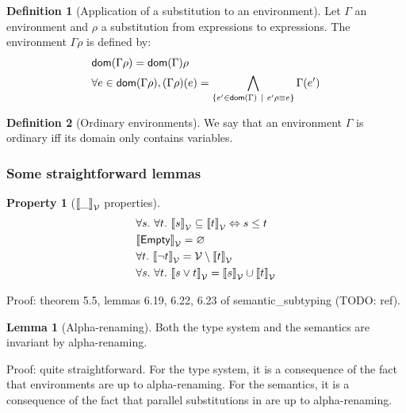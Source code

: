 \documentclass[a4paper]{article}
\theoremstyle{definition}
\newtheorem{lemma}{Lemma}
\newtheorem{definition}{Definition}
\newtheorem{property}{Property}
\begin{document}
      \begin{definition}[Application of a substitution to an environment]
        Let $\Gamma$ an environment and $\rho$ a substitution from expressions to expressions.
        The environment $\Gamma\rho$ is defined by:
        \begin{align*}
          &\textsf{dom}(\Gamma\rho) = \textsf{dom}(\Gamma) \rho\\
          &\forall e \in \textsf{dom}(\Gamma\rho), (\Gamma\rho)(e) = \bigwedge_{\{e' \in \textsf{dom}(\Gamma) ~|~ e'\rho\equiv e\}}\Gamma(e')
        \end{align*}
      \end{definition}
    
      \begin{definition}[Ordinary environments]
        We say that an environment $\Gamma$ is ordinary iff its domain only contains variables.
      \end{definition}

    \subsubsection{Some straightforward lemmas}

        \begin{property}[${\llbracket \_ \rrbracket}_{\mathcal{V}}$ properties]
          \begin{align*}
            &\forall s.\ \forall t.\ {\llbracket s \rrbracket}_{\mathcal{V}} \subseteq {\llbracket t \rrbracket}_{\mathcal{V}} \Leftrightarrow s \leq t\\
            &{\llbracket \textsf{Empty} \rrbracket}_{\mathcal{V}} = \varnothing\\
            &\forall t.\ {\llbracket \neg t \rrbracket}_{\mathcal{V}} = \mathcal{V} \setminus {\llbracket t \rrbracket}_{\mathcal{V}}\\
            &\forall s.\ \forall t.\ {\llbracket s\vee t \rrbracket}_{\mathcal{V}} = {\llbracket s \rrbracket}_{\mathcal{V}} \cup {\llbracket t \rrbracket}_{\mathcal{V}}
          \end{align*}
        \end{property}
        Proof: theorem 5.5, lemmas 6.19, 6.22, 6.23 of semantic\_subtyping (TODO: ref).

        \begin{lemma}[Alpha-renaming]
          Both the type system and the semantics are invariant by alpha-renaming.
        \end{lemma}
        Proof: quite straightforward.
        For the type system, it is a consequence of the fact that environments are up to alpha-renaming.
        For the semantics, it is a consequence of the fact that parallel substitutions in 
        are up to alpha-renaming.
\end{document}

